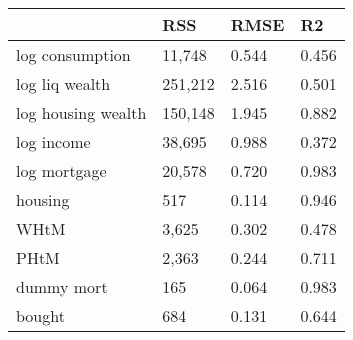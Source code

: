 \begin{table}[htbp]
\centering
\begin{tabular}{llll} \hline \hline
 & RSS  & RMSE  & R2  \\  \hline 
log consumption &    11,748 &     0.544 &     0.456 \\  
log liq wealth &   251,212 &     2.516 &     0.501 \\  
log housing wealth &   150,148 &     1.945 &     0.882 \\  
log income &    38,695 &     0.988 &     0.372 \\  
log mortgage &    20,578 &     0.720 &     0.983 \\  
housing &       517 &     0.114 &     0.946 \\  
WHtM &     3,625 &     0.302 &     0.478 \\  
PHtM &     2,363 &     0.244 &     0.711 \\  
dummy mort &       165 &     0.064 &     0.983 \\  
bought &       684 &     0.131 &     0.644 \\  
\hline \hline \end{tabular}
\end{table}
